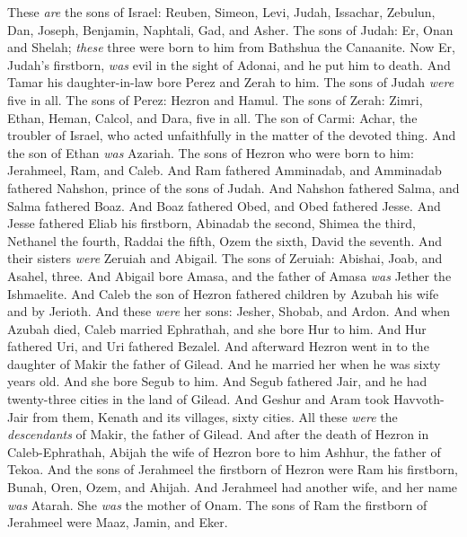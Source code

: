 \begin{biblechapter} %
 These \textit{are} the sons of Israel: Reuben, Simeon, Levi, Judah, Issachar, Zebulun,
\verse Dan, Joseph, Benjamin, Naphtali, Gad, and Asher.
\verse The sons of Judah: Er, Onan and Shelah; \textit{these} three were born to him from Bathshua the Canaanite. Now Er, Judah’s firstborn, \textit{was} evil in the sight of Adonai, and he put him to death.
\verse And Tamar his daughter-in-law bore Perez and Zerah to him. The sons of Judah \textit{were} five in all.
\verse The sons of Perez: Hezron and Hamul.
\verse The sons of Zerah: Zimri, Ethan, Heman, Calcol, and Dara, five in all.
\verse The son of Carmi: Achar, the troubler of Israel, who acted unfaithfully in the matter of the devoted thing.
\verse And the son of Ethan \textit{was} Azariah.
\verse The sons of Hezron who were born to him: Jerahmeel, Ram, and Caleb.
\verse And Ram fathered Amminadab, and Amminadab fathered Nahshon, prince of the sons of Judah.
\verse And Nahshon fathered Salma, and Salma fathered Boaz.
\verse And Boaz fathered Obed, and Obed fathered Jesse.
\verse And Jesse fathered Eliab his firstborn, Abinadab the second, Shimea the third,
\verse Nethanel the fourth, Raddai the fifth,
\verse Ozem the sixth, David the seventh.
\verse And their sisters \textit{were} Zeruiah and Abigail. The sons of Zeruiah: Abishai, Joab, and Asahel, three.
\verse And Abigail bore Amasa, and the father of Amasa \textit{was} Jether the Ishmaelite.
\verse And Caleb the son of Hezron fathered children by Azubah his wife and by Jerioth. And these \textit{were} her sons: Jesher, Shobab, and Ardon.
\verse And when Azubah died, Caleb married Ephrathah, and she bore Hur to him.
\verse And Hur fathered Uri, and Uri fathered Bezalel.
\verse And afterward Hezron went in to the daughter of Makir the father of Gilead. And he married her when he was sixty years old. And she bore Segub to him.
\verse And Segub fathered Jair, and he had twenty-three cities in the land of Gilead.
\verse And Geshur and Aram took Havvoth-Jair from them, Kenath and its villages, sixty cities. All these \textit{were} the \textit{descendants} of Makir, the father of Gilead.
\verse And after the death of Hezron in Caleb-Ephrathah, Abijah the wife of Hezron bore to him Ashhur, the father of Tekoa.
\verse And the sons of Jerahmeel the firstborn of Hezron were Ram his firstborn, Bunah, Oren, Ozem, and Ahijah.
\verse And Jerahmeel had another wife, and her name \textit{was} Atarah. She \textit{was} the mother of Onam.
\verse The sons of Ram the firstborn of Jerahmeel were Maaz, Jamin, and Eker.

\end{biblechapter}
